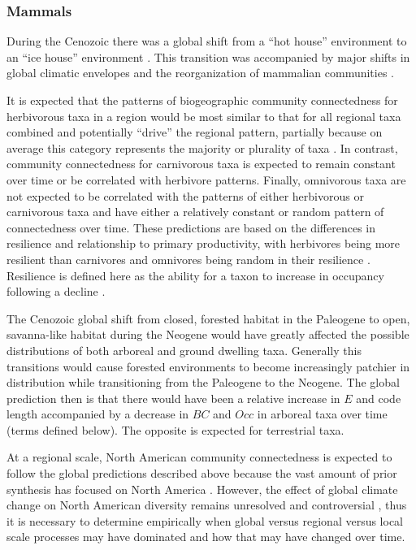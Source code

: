 \documentclass[12pt,letterpaper]{article}
\begin{document}
\subsubsection{Mammals}
During the Cenozoic there was a global shift from a ``hot house'' environment to an ``ice house'' environment \citep{Zachos2008,Zachos2001}. This transition was accompanied by major shifts in global climatic envelopes and the reorganization of mammalian communities \citep{Janis1993a,Fortelius2002,Blois2009,Alroy2000g,Figueirido2012}. 

It is expected that the patterns of biogeographic community connectedness for herbivorous taxa in a region would be most similar to that for all regional taxa combined and potentially ``drive'' the regional pattern, partially because on average this category represents the majority or plurality of taxa \citep{Jernvall2002}. In contrast, community connectedness for carnivorous taxa is expected to remain constant over time or be correlated with herbivore patterns. Finally, omnivorous taxa are not expected to be correlated with the patterns of either herbivorous or carnivorous taxa and have either a relatively constant or random pattern of connectedness over time.  These predictions are based on the differences in resilience and relationship to primary productivity, with herbivores being more resilient than carnivores and omnivores being random in their resilience \citep{Jernvall2004}. Resilience is defined here as the ability for a taxon to increase in occupancy following a decline \citep{Jernvall2004}.

The Cenozoic global shift from closed, forested habitat in the Paleogene to open, savanna-like habitat during the Neogene would have greatly affected the possible distributions of both arboreal and ground dwelling taxa. Generally this transitions would cause forested environments to become increasingly patchier in distribution while transitioning from the Paleogene to the Neogene. The global prediction then is that there would have been a relative increase in \(E\) and code length accompanied by a decrease in \(BC\) and \(Occ\) in arboreal taxa over time (terms defined below). The opposite is expected for terrestrial taxa. 

At a regional scale, North American community connectedness is expected to follow the global predictions described above because the vast amount of prior synthesis has focused on North America \citep{Alroy2000g,Alroy1996a,Alroy1998,Barnosky2001a,Simpson1944,Simpson1953,Badgley2013,Blois2009,Figueirido2012,Gunnell1995,Hadly2001}. However, the effect of global climate change on North American diversity remains unresolved and controversial \citep{Alroy2000g,Blois2009,Figueirido2012,Barnosky2001a}, thus it is necessary to determine empirically when global versus regional versus local scale processes may have dominated and how that may have changed over time.
\end{document}
